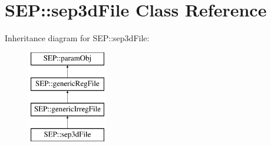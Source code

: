 \hypertarget{class_s_e_p_1_1sep3d_file}{}\section{S\+EP\+:\+:sep3d\+File Class Reference}
\label{class_s_e_p_1_1sep3d_file}
Inheritance diagram for S\+EP\+:\+:sep3d\+File\+:\begin{figure}[H]
\begin{center}
\leavevmode
\includegraphics[height=4.000000cm]{class_s_e_p_1_1sep3d_file}
\end{center}
\end{figure}
